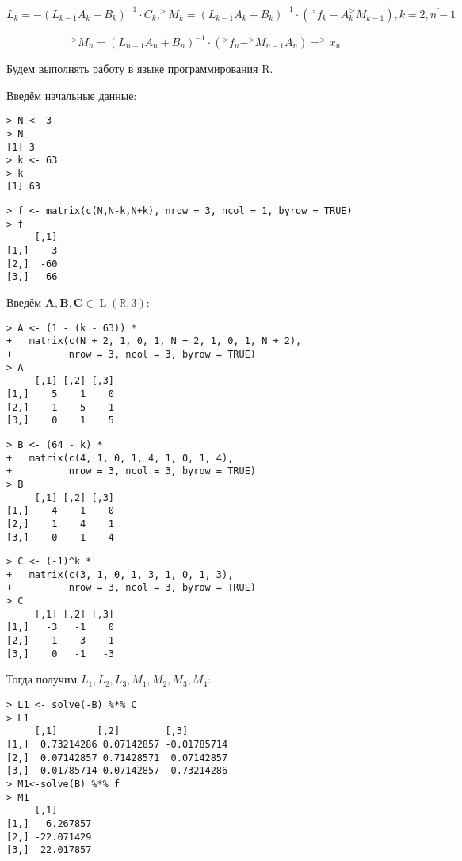 \documentclass[14pt,a4paper]{scrartcl}
\begin{document}
\begin{equation*}
	L_{k}=-\left(L_{k-1} A_{k}+B_{k}\right)^{-1} \cdot C_{k},^{>} M_{k}=\left(L_{k-1} A_{k}+B_{k}\right)^{-1} \cdot\left(^{>} f_{k}-A_{k}^{>} M_{k-1}\right), k=\overline{2, n-1}
\end{equation*}

\begin{equation*}
	^>M_{n}=\left(L_{n-1} A_{n}+B_{n}\right)^{-1} \cdot\left(^>f_{n}-^{>} M_{n-1} A_{n}\right)=^>x_{n}
\end{equation*}


Будем выполнять работу в языке программирования R.

Введём начальные данные:

\begin{verbatim}
> N <- 3
> N
[1] 3
> k <- 63
> k
[1] 63
\end{verbatim}

\begin{verbatim}
> f <- matrix(c(N,N-k,N+k), nrow = 3, ncol = 1, byrow = TRUE)
> f 
     [,1]
[1,]    3
[2,]  -60
[3,]   66
\end{verbatim}

\pagebreak
Введём $\mathbf{A}, \mathbf{B}, \mathbf{C} \in \operatorname{L}(\mathbb{R},3)$:

\begin{verbatim}
> A <- (1 - (k - 63)) *
+   matrix(c(N + 2, 1, 0, 1, N + 2, 1, 0, 1, N + 2), 
+          nrow = 3, ncol = 3, byrow = TRUE)
> A
     [,1] [,2] [,3]
[1,]    5    1    0
[2,]    1    5    1
[3,]    0    1    5
\end{verbatim}

\begin{verbatim}
> B <- (64 - k) * 
+   matrix(c(4, 1, 0, 1, 4, 1, 0, 1, 4),
+          nrow = 3, ncol = 3, byrow = TRUE)
> B
     [,1] [,2] [,3]
[1,]    4    1    0
[2,]    1    4    1
[3,]    0    1    4
\end{verbatim}

\begin{verbatim}
> C <- (-1)^k * 
+   matrix(c(3, 1, 0, 1, 3, 1, 0, 1, 3),
+          nrow = 3, ncol = 3, byrow = TRUE)
> C
     [,1] [,2] [,3]
[1,]   -3   -1    0
[2,]   -1   -3   -1
[3,]    0   -1   -3
\end{verbatim}

Тогда получим $L_{1}, L_{2}, L_{3}, M_{1}, M_{2}, M_{3}, M_4$:

\begin{verbatim}
> L1 <- solve(-B) %*% C
> L1
     [,1]       [,2]        [,3]
[1,]  0.73214286 0.07142857 -0.01785714
[2,]  0.07142857 0.71428571  0.07142857
[3,] -0.01785714 0.07142857  0.73214286
> M1<-solve(B) %*% f
> M1
     [,1]
[1,]   6.267857
[2,] -22.071429
[3,]  22.017857
\end{verbatim}
\end{document}
